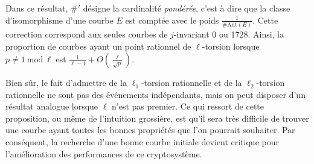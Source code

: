 \documentclass[11pt,a4paper]{article}
\renewcommand{\mod}{\ \mathrm{mod}\ }
\theoremstyle{definition}
\begin{document}
Dans ce résultat, $\#'$ désigne la cardinalité \emph{pondérée}, c'est à dire que la classe d'isomorphisme d'une courbe $E$ est comptée avec le poids $\frac{1}{\#\mathrm{Aut}(E)}$. Cette correction correspond aux seules courbes de $j$-invariant 0 ou 1728. Ainsi, la proportion de courbes ayant un point rationnel de $\ell$-torsion lorsque $p\neq 1 \mod \ell$ est $\frac{1}{\ell - 1} + O(\frac{\ell}{\sqrt{p}}).$

Bien sûr, le fait d'admettre de la $\ell_1$-torsion rationnelle et de la $\ell_2$-torsion rationnelle ne sont pas des événements indépendants, mais on peut disposer d'un résultat analogue lorsque $\ell$ n'est pas premier. Ce qui ressort de cette proposition, ou même de l'intuition grossière, est qu'il sera très difficile de trouver une courbe ayant toutes les bonnes propriétés que l'on pourrait souhaiter. Par conséquent, la recherche d'une bonne courbe initiale devient critique pour l'amélioration des performances de ce cryptosystème.
\end{document}

